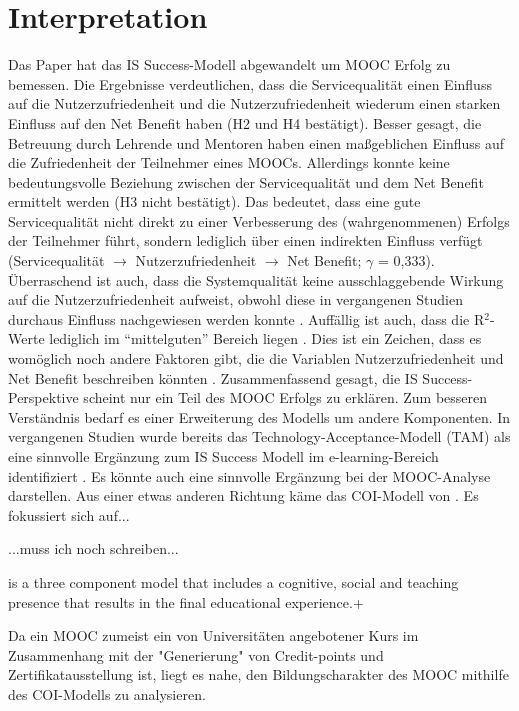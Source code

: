 \section{Interpretation}
\label{sec:vergleich}
Das Paper hat das IS Success-Modell abgewandelt um MOOC Erfolg zu bemessen.  
Die Ergebnisse verdeutlichen, dass die Servicequalität einen Einfluss auf die Nutzerzufriedenheit und die Nutzerzufriedenheit wiederum einen starken Einfluss auf den Net Benefit haben (H2 und H4 bestätigt). Besser gesagt, die Betreuung durch Lehrende und Mentoren haben einen maßgeblichen Einfluss auf die Zufriedenheit der Teilnehmer eines MOOCs. Allerdings konnte keine bedeutungsvolle Beziehung zwischen der Servicequalität und dem Net Benefit ermittelt werden (H3 nicht bestätigt). Das bedeutet, dass eine gute Servicequalität nicht direkt zu einer Verbesserung des (wahrgenommenen) Erfolgs der Teilnehmer führt, sondern lediglich über einen indirekten Einfluss verfügt (Servicequalität $\rightarrow$ Nutzerzufriedenheit $\rightarrow$ Net Benefit; $\gamma$ = 0,333). Überraschend ist auch, dass die Systemqualität keine ausschlaggebende Wirkung auf die Nutzerzufriedenheit aufweist, obwohl diese in vergangenen Studien durchaus Einfluss nachgewiesen werden konnte \parencite{freeze2010success, islam2013investigating, mohammadi2015factors}. 
Auffällig ist auch, dass die R$^2$-Werte lediglich im "`mittelguten"' Bereich liegen \parencite[vgl.][S.323]{chin1998partial}. Dies ist ein Zeichen, dass es womöglich noch andere Faktoren gibt, die die Variablen Nutzerzufriedenheit und Net Benefit beschreiben könnten \parencite[vgl.][S.179]{freeze2010success}.  
Zusammenfassend gesagt, die IS Success-Perspektive scheint nur ein Teil des MOOC Erfolgs zu erklären. Zum besseren Verständnis bedarf es einer Erweiterung des Modells um andere Komponenten. In vergangenen Studien wurde bereits das Technology-Acceptance-Modell (TAM) als eine sinnvolle Ergänzung zum IS Success Modell im e-learning-Bereich identifiziert \parencite{mohammadi2015factors}. Es könnte auch eine sinnvolle Ergänzung bei der MOOC-Analyse darstellen. 
Aus einer etwas anderen Richtung käme das COI-Modell von \textcite{garrison1999critical}. Es fokussiert sich auf...

...muss ich noch schreiben...

is a three component model that includes a cognitive, social and teaching presence that results in the final educational experience.+

Da ein MOOC zumeist ein von Universitäten angebotener Kurs im Zusammenhang mit der "Generierung" von Credit-points und Zertifikatausstellung ist, liegt es nahe, den Bildungscharakter des MOOC mithilfe des COI-Modells zu analysieren.     


